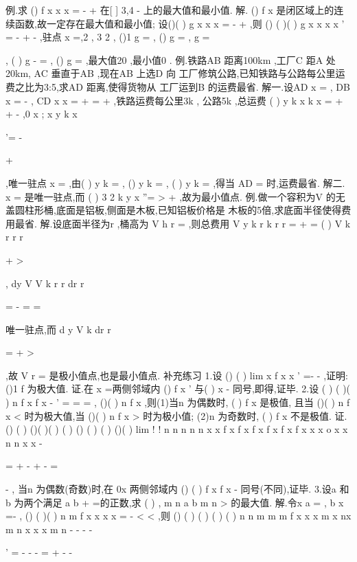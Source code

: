 \textcolor{lyred}{例}.求
()
f x
x
x
=
-
+
在[
]
3,4
-
上的最大值和最小值. 
解.
()
f x 是闭区域上的连续函数,故一定存在最大值和最小值; 
设()(
)
g x
x
x
=
-
+
,则
()
(
)(
)
g
x
x
x
x
'
=
-
+
-
,驻点
x =,2 , 3
2 , 
()1
g
=
, ()
g
=
,
g 
=




, (
)
g -
=
, ()
g
=
,最大值20 ,最小值0 . 
\textcolor{lyred}{例}.铁路AB 距离100km ,工厂C 距A 处20km, AC 垂直于AB ,现在AB 上选D 向 
工厂修筑公路,已知铁路与公路每公里运费之比为3:5,求AD 距离,使得货物从 
工厂运到B 的运费最省. 
解一.设AD
x
=
,
DB
x
=
-
,
CD
x
x
=
+
=
+
,铁路运费每公里3k , 
公路5k ,总运费
(
)
y
k
x
k
x
=
+
+
-
,0
x
\le 
\le 
; 
x
y
k
x


'=
-


+


,唯一驻点
x =
,由(
)
y
k
=
, ()
y
k
=
, 
(
)
y
k
=
,得当
AD =
时,运费最省. 
解二.
x =
是唯一驻点,而
(
)
3 2
k
y
x
''=
>
+
,故为最小值点. 
\textcolor{lyred}{例}.做一个容积为V 的无盖圆柱形桶,底面是铝板,侧面是木板,已知铝板价格是 
木板的5倍,求底面半径使得费用最省. 
解.设底面半径为r ,桶高为
V
h
r
\pi 
=
,则总费用
V
y
k
r
k
r
r
\pi 
\pi 
\pi 
=
\cdots 
+
\cdots 
\cdots 
= 
(
)
V
k
r
r
r
\pi 


+
>




,
dy
V
V
k
r
r
dr
r
\pi 
\pi 


=
-
=
\Rightarrow 
=




唯一驻点,而 
d y
V
k
dr
r
\pi 


=
+
>




,故
V
r
\pi 
=
是极小值点,也是最小值点. 
\textcolor{lyred}{补充练习 }
1.设
()
(
)
lim
x
f
x
x
\to 
'
=-
-
,证明:
()1
f
为极大值. 
证.在
x =两侧邻域内
()
f
x
'
与(
)
x -
同号,即得,证毕. 
2.设
(
)
(
)(
)
n
f
x
f
x
-
'
=
=
=
\Lambda 
,
()(
)
n
f
x
\neq 
,则(1)当n 为偶数时,
(
)
f x
是极值, 
且当
()(
)
n
f
x
<
时为极大值,当
()(
)
n
f
x
>
时为极小值; 
(2)n 为奇数时,
(
)
f x
不是极值. 
证.
()
(
)
()(
)(
)
(
)
()
(
)
(
)
()(
)
lim
!
!
n
n
n
n
n
x
x
f
x
f x
f x
f
x
f x
f x
x
x
o
x
x
n
n
x
x
\to 
-


=
+
-
+
-
\Rightarrow 
=


-
, 
当n 为偶数(奇数)时,在
0x 两侧邻域内
()
(
)
f x
f x
-
同号(不同),证毕. 
3.设a 和b 为两个满足
a
b
+
=的正数,求
(
)
,
m
n
a b
m n >
的最大值. 
解.令x
a
=
,
b
x
=-
,
()
(
)(
)
n
m
f x
x
x
x
=
-
<
<
,则 
()
(
)
(
)
(
)
(
)
n
n
m
m
m
f
x
x
x
m
x
nx
m
n x
x
x
m
n
-
-
-
-


'
=
-
-
-
=
+
-
-






